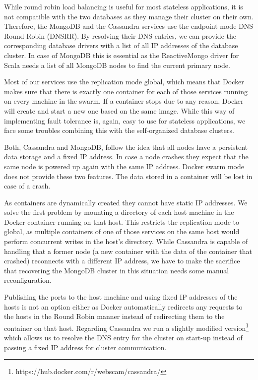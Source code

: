 \documentclass[a4paper]{article}
\begin{document}
While round robin load balancing is useful for most stateless applications, it is not compatible with the two databases as they manage their cluster on their own. Therefore, the MongoDB and the Cassandra services use the endpoint mode DNS Round Robin (DNSRR). By resolving their DNS entries, we can provide the corresponding database drivers with a list of all IP addresses of the database cluster. In case of MongoDB this is essential as the ReactiveMongo driver for Scala needs a list of all MongoDB nodes to find the current primary node.

Most of our services use the replication mode global, which means that Docker makes sure that there is exactly one container for each of those services running on every machine in the swarm. If a container stops due to any reason, Docker will create and start a new one based on the same image. While this way of implementing fault tolerance is, again, easy to use for stateless applications, we face some troubles combining this with the self-organized database clusters.

Both, Cassandra and MongoDB, follow the idea that all nodes have a persistent data storage and a fixed IP address. In case a node crashes they expect that the same node is powered up again with the same IP address. Docker swarm mode does not provide these two features. The data stored in a container will be lost in case of a crash.

As containers are dynamically created they cannot have static IP addresses. We solve the first problem by mounting a directory of each host machine in the Docker container running on that host. This restricts the replication mode to global, as multiple containers of one of those services on the same host would perform concurrent writes in the host's directory. While Cassandra is capable of handling that a former node (a new container with the data of the container that crashed) reconnects with a different IP address, we have to make the sacrifice that recovering the MongoDB cluster in this situation needs some manual reconfiguration.

Publishing the ports to the host machine and using fixed IP addresses of the hosts is not an option either as Docker automatically redirects any requests to the hosts in the Round Robin manner instead of redirecting them to the container on that host.
Regarding Cassandra we run a slightly modified version\footnote{https://hub.docker.com/r/webscam/cassandra/} which allows us to resolve the DNS entry for the cluster on start-up instead of passing a fixed IP address for cluster communication.
\end{document}
